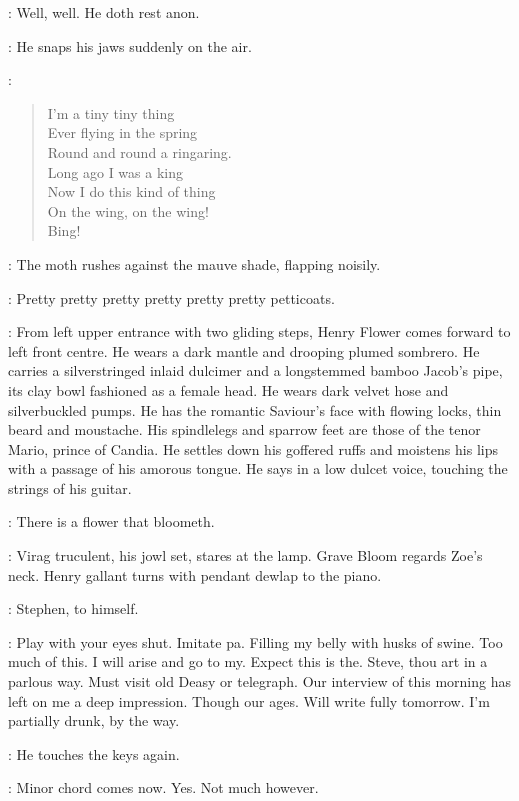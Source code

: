 \Virag:
Well,
well.
He doth rest anon.

:
He snaps his jaws suddenly on the air.

\Moth[2]:
\begin{verse}
    I'm a tiny tiny thing\\
%
    Ever flying in the spring\\
    Round and round a ringaring.\\
    Long ago I was a king\\
    Now I do this kind of thing\\
    On the wing,
on the wing!\\
    Bing!
\end{verse}

:
The moth rushes against the mauve shade,
flapping noisily.

\Moth:
Pretty pretty pretty pretty pretty pretty petticoats.

:
From left upper entrance with two gliding steps,
Henry Flower comes forward to left front centre.
He wears a dark mantle and drooping plumed sombrero.
He carries a silverstringed inlaid dulcimer and
a longstemmed bamboo Jacob's pipe,
its clay bowl fashioned as a female head.
He wears dark velvet hose and silverbuckled pumps.
He has the romantic Saviour's face with flowing locks,
thin beard and moustache.
His spindlelegs and sparrow feet are those of the tenor Mario,
prince of Candia.
He settles down his goffered ruffs
and moistens his lips with a passage of his amorous tongue.
He says in a low dulcet voice,
touching the strings of his guitar.

\Henry:
There is a flower that bloometh.%

:
Virag truculent,
his jowl set,
stares at the lamp.
Grave Bloom regards Zoe's neck.
Henry gallant turns with pendant dewlap to the piano.

:
Stephen,
to himself.

\Stephen:
Play with your eyes shut.
Imitate pa.
Filling my belly with husks of swine.
Too much of this.
I will arise and go to my.
Expect this is the.
Steve,
thou art in a parlous way.
Must visit old Deasy or telegraph.
Our interview of this morning has left on me a deep impression.
Though our ages.
Will write fully tomorrow.
I'm partially drunk,
by the way.

:
He touches the keys again.

\Stephen:
Minor chord comes now.
Yes.
Not much however.


